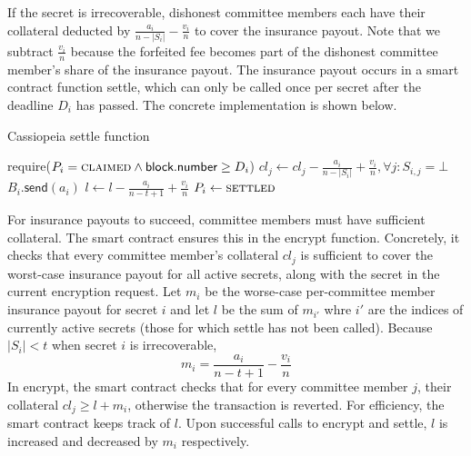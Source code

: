 If the secret is irrecoverable, dishonest committee members each have their collateral deducted by $\frac{a_i}{n - |S_i|} - \frac{v_i}{n}$ to cover the insurance payout.
Note that we subtract $\frac{v_i}{n}$ because the forfeited fee becomes part of the dishonest committee member's share of the insurance payout.
The insurance payout occurs in a smart contract function \textsf{settle}, which can only be called once per secret after the deadline $D_i$ has passed.
The concrete implementation is shown below.

\begin{algorithm}[H]
\caption{Cassiopeia \textsf{settle} function}
    \begin{algorithmic}[1]
                \State require($P_i = \textsc{claimed} \land \textsf{block.number} \geq D_i$)
                    \State $cl_j \gets cl_j - \frac{a_i}{n - |S_i|} + \frac{v_i}{n}, \forall j : S_{i,j} = \bot$
                    \State $B_i.\textsf{send}(a_i)$
                \EndIf
                \State $l \gets l - \frac{a_i}{n-t+1} + \frac{v_i}{n}$
                \State $P_i \gets \textsc{settled}$
            \EndFunction
    \end{algorithmic}
\end{algorithm}

For insurance payouts to succeed, committee members must have sufficient collateral.
The smart contract ensures this in the \textsf{encrypt} function.
Concretely, it checks that every committee member's collateral $cl_j$ is sufficient to cover the worst-case insurance payout for all active secrets, along with the secret in the current encryption request.
Let $m_i$ be the worse-case per-committee member insurance payout for secret $i$ and let $l$ be the sum of $m_{i'}$ whre $i'$ are the indices of currently active secrets (those for which \textsf{settle} has not been called).
Because $|S_i| < t$ when secret $i$ is irrecoverable,
\begin{equation}\label{worst-case-payout}
    m_i = \frac{a_{i}}{n-t+1} - \frac{v_i}{n} 
\end{equation}
In \textsf{encrypt}, the smart contract checks that for every committee member $j$, their collateral $cl_j \geq l + m_i$, otherwise the transaction is reverted.
For efficiency, the smart contract keeps track of $l$.
Upon successful calls to \textsf{encrypt} and \textsf{settle}, $l$ is increased and decreased by $m_i$ respectively.

